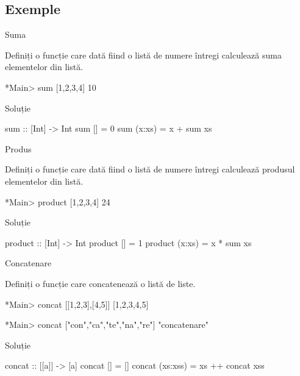 \documentclass[handout,xcolor=pdftex,romanian,colorlinks]{beamer}
\begin{document}
\subsection{Exemple}
\begin{frame}[fragile]{Suma}
\begin{block}{}
Definiți o funcție care dată fiind o listă de numere întregi calculează suma elementelor din listă.
\begin{asciihs}
*Main> sum [1,2,3,4]
10
\end{asciihs}
\end{block}
\begin{block}{Soluție }
\begin{asciihs}
sum :: [Int] -> Int
sum []     = 0
sum (x:xs) = x + sum xs
\end{asciihs}
\end{block}
\end{frame}


\begin{frame}[fragile]{Produs}
\begin{block}{}
Definiți o funcție care dată fiind o listă de numere întregi calculează produsul elementelor din listă.
\begin{asciihs}
*Main> product [1,2,3,4]
24
\end{asciihs}
\end{block}
\begin{block}{Soluție }
\begin{asciihs}
product :: [Int] -> Int
product []     = 1
product (x:xs) = x * sum xs
\end{asciihs}
\end{block}
\end{frame}

\begin{frame}[fragile]{Concatenare}
\begin{block}{}
Definiți o funcție care concatenează o listă de liste.
\begin{asciihs}
*Main> concat [[1,2,3],[4,5]]
[1,2,3,4,5]

*Main> concat ["con","ca","te","na","re"]
"concatenare"
\end{asciihs}
\end{block}
\begin{block}{Soluție }
\begin{asciihs}
concat :: [[a]] -> [a]
concat []       = []
concat (xs:xss) = xs ++ concat xss
\end{asciihs}
\end{block}
\end{frame}
\end{document}
